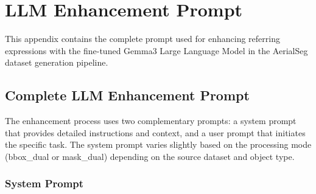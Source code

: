 \chapter{LLM Enhancement Prompt}
\label{chapter:appendixA}

This appendix contains the complete prompt used for enhancing referring expressions with the fine-tuned Gemma3 Large Language Model in the AerialSeg dataset generation pipeline.

\section{Complete LLM Enhancement Prompt}

The enhancement process uses two complementary prompts: a system prompt that provides detailed instructions and context, and a user prompt that initiates the specific task. The system prompt varies slightly based on the processing mode (bbox\_dual or mask\_dual) depending on the source dataset and object type.

\subsection{System Prompt}

